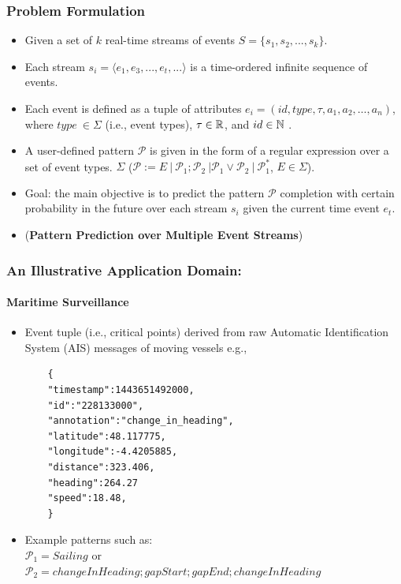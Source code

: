 \frame
{
	\frametitle{Problem Formulation}
	
	\begin{itemize}[]
		\item<only@1>Given a set of $k$ real-time streams of events $S = \{ s_1,s_2, ..., s_k\}$.
		
		\item<only@1> Each stream  $s_i=\langle e_1,e_3,...,e_t,...\rangle$  is a time-ordered infinite sequence of events.
		
		\item<only@1> Each event is defined as a tuple of attributes $e_i = (id,type,\tau,a_1,a_2,\ldots,a_n)$, where $type\ \in  \Sigma$ (i.e., event types), $\tau\in\mathbb{R}$, and  $id\in\mathbb{N}$ . 
		\item<only@1> A user-defined pattern $\mathcal{P}$ is given in the form of a regular expression over a set of event types. $\Sigma$ ($\mathcal{P} := E\ |\ \mathcal{P}_{1} ; \mathcal{P}_{2}\ | \mathcal{P}_{1} \vee \mathcal{P}_{2}\ |\ \mathcal{P}_{1}^{*}$,  $E \in \Sigma$).
		
		
		\item<2->Goal: the main objective is to predict the pattern $\mathcal{P}$ completion with certain probability in the future over each stream $s_i$ given the current time event $e_t$. 
		
		\item<3-> (\textbf{Pattern Prediction over Multiple Event Streams})
	\end{itemize}
}

\begin{frame}[fragile]

	\frametitle{An Illustrative Application Domain:}
    \framesubtitle{Maritime Surveillance}
	\begin{itemize}
		\item<only@1> Event tuple (i.e., critical points) derived from raw Automatic Identification System (AIS) messages of moving vessels e.g., 
		\begin{verbatim}
	{
	"timestamp":1443651492000,
	"id":"228133000",
	"annotation":"change_in_heading",
	"latitude":48.117775,
	"longitude":-4.4205885,
	"distance":323.406,
	"heading":264.27
	"speed":18.48,
	}
	\end{verbatim}
	
		\item<only@1> Example patterns such as:\\
 	   $\mathcal{P}_1=Sailing$ or\\ 
 	   $\mathcal{P}_2=changeInHeading; gapStart; gapEnd; changeInHeading$
	\end{itemize}
\end{frame}

